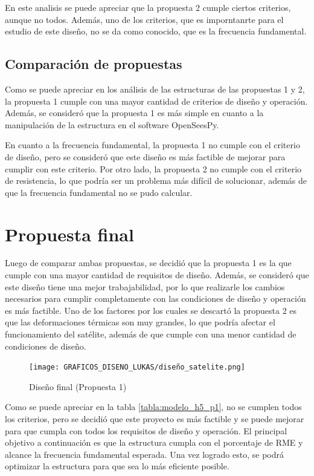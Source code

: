 En este analisis se puede apreciar que la propuesta 2 cumple ciertos criterios, aunque no todos. Además, uno de los criterios, que es imporntanrte para el estudio de este diseño, no se da como conocido, que es la frecuencia fundamental.

\subsection{Comparación de propuestas}

Como se puede apreciar en los análisis de las estructuras de las propuestas 1 y 2, la propuesta 1 cumple con una mayor cantidad de criterios de diseño y operación. Además, se consideró que la propuesta 1 es más simple en cuanto a la manipulación de la estructura en el software OpenSeesPy. 

En cuanto a la frecuencia fundamental, la propuesta 1 no cumple con el criterio de diseño, pero se consideró que este diseño es más factible de mejorar para cumplir con este criterio. Por otro lado, la propuesta 2 no cumple con el criterio de resistencia, lo que podría ser un problema más difícil de solucionar, además de que la frecuencia fundamental no se pudo calcular.
\newpage
\section{Propuesta final}

Luego de comparar ambas propuestas, se decidió que la propuesta 1 es la que cumple con una mayor cantidad de requisitos de diseño. Además, se consideró que este diseño tiene una mejor trabajabilidad, por lo que realizarle los cambios necesarios para cumplir completamente con las condiciones de diseño y operación es más factible. Uno de los factores por los cuales se descartó la propuesta 2 es que las deformaciones térmicas son muy grandes, lo que podría afectar el funcionamiento del satélite, además de que cumple con una menor cantidad de condiciones de diseño.

\begin{figure}[H]
    \centering
    \texttt{[image: GRAFICOS\_DISENO\_LUKAS/diseño\_satelite.png]}
    \caption{Diseño final (Propuesta 1)}
    \label{fig:propuesta1}
\end{figure}

Como se puede apreciar en la tabla \ref{tabla:modelo_h5_p1}, no se cumplen todos los criterios, pero se decidió que este proyecto es más factible y se puede mejorar para que cumpla con todos los requisitos de diseño y operación. El principal objetivo a continuación es que la estructura cumpla con el porcentaje de RME y alcance la frecuencia fundamental esperada. Una vez logrado esto, se podrá optimizar la estructura para que sea lo más eficiente posible.

